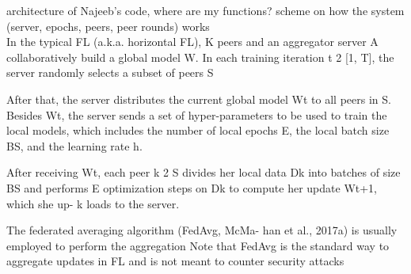 architecture of Najeeb's code, where are my functions?
scheme on how the system (server, epochs, peers, peer rounds) works\\

In the typical FL (a.k.a. horizontal FL), K peers and an aggregator server
A collaboratively build a global model W. In each training iteration
t 2 [1, T], the server randomly selects a subset of peers S

After that, the server distributes the current global model Wt to all peers
in S. Besides Wt, the server sends a set of hyper-parameters to be used
to train the local models, which includes the number of local epochs E,
the local batch size BS, and the learning rate h.

After receiving Wt, each
peer k 2 S divides her local data Dk into batches of size BS and performs
E optimization steps on Dk to compute her update Wt+1, which she up- k
loads to the server.

The federated averaging algorithm (FedAvg, McMa- han et al., 2017a) is usually employed to perform the aggregation
Note that FedAvg is the standard way to aggregate updates in FL and is
not meant to counter security attacks


\pagebreak